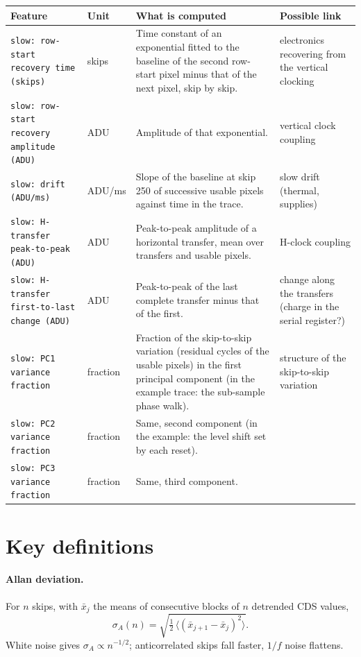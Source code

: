 \documentclass[10pt]{article}
\begin{document}
\begin{longtable}{>{\raggedright\arraybackslash}p{}>{\raggedright\arraybackslash}p{}>{\raggedright\arraybackslash}p{}>{\raggedright\arraybackslash}p{}}
\toprule Feature & Unit & What is computed & Possible link \\ \midrule \endhead
\bottomrule \endfoot
\texttt{slow: row-start recovery time (skips)} & skips & Time constant of an exponential fitted to the baseline of the second row-start pixel minus that of the next pixel, skip by skip. & electronics recovering from the vertical clocking \\
\texttt{slow: row-start recovery amplitude (ADU)} & ADU & Amplitude of that exponential. & vertical clock coupling \\
\texttt{slow: drift (ADU/ms)} & ADU/ms & Slope of the baseline at skip 250 of successive usable pixels against time in the trace. & slow drift (thermal, supplies) \\
\texttt{slow: H-transfer peak-to-peak (ADU)} & ADU & Peak-to-peak amplitude of a horizontal transfer, mean over transfers and usable pixels. & H-clock coupling \\
\texttt{slow: H-transfer first-to-last change (ADU)} & ADU & Peak-to-peak of the last complete transfer minus that of the first. & change along the transfers (charge in the serial register?) \\
\texttt{slow: PC1 variance fraction} & fraction & Fraction of the skip-to-skip variation (residual cycles of the usable pixels) in the first principal component (in the example trace: the sub-sample phase walk). & structure of the skip-to-skip variation \\
\texttt{slow: PC2 variance fraction} & fraction & Same, second component (in the example: the level shift set by each reset). &  \\
\texttt{slow: PC3 variance fraction} & fraction & Same, third component. &  \\
\end{longtable}

\section{Key definitions}

\paragraph{Allan deviation.} For $n$ skips, with $\bar{x}_j$ the means of consecutive blocks of $n$ detrended CDS values,
\begin{equation}
\sigma_A(n) = \sqrt{\tfrac{1}{2}\,\langle(\bar{x}_{j+1}-\bar{x}_j)^2\rangle}.
\end{equation}
White noise gives $\sigma_A\propto n^{-1/2}$; anticorrelated skips fall faster, $1/f$ noise flattens.
\end{document}
